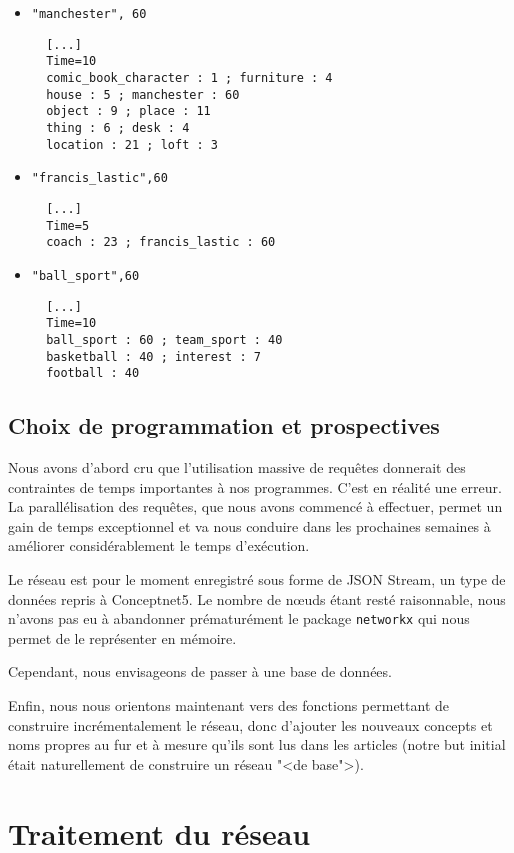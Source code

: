 \documentclass[a4paper,12pt]{article}
\newcommand{\pyt}[1]{\texttt{#1}}
\begin{document}
\begin{itemize}
 \item \verb|"manchester", 60|
 \begin{verbatim}
  [...]
  Time=10
  comic_book_character : 1 ; furniture : 4
  house : 5 ; manchester : 60
  object : 9 ; place : 11
  thing : 6 ; desk : 4
  location : 21 ; loft : 3
 \end{verbatim}
\item \verb|"francis_lastic",60|
\begin{verbatim}
  [...]
  Time=5
  coach : 23 ; francis_lastic : 60
\end{verbatim}
\item \verb|"ball_sport",60|
\begin{verbatim}
  [...]
  Time=10
  ball_sport : 60 ; team_sport : 40
  basketball : 40 ; interest : 7
  football : 40
\end{verbatim}
\end{itemize}

\subsection{Choix de programmation et prospectives}

Nous avons d'abord cru que l'utilisation massive de requ\^etes donnerait des contraintes de temps importantes \`a nos programmes. C'est en r\'ealit\'e une erreur. La parall\'elisation des requ\^etes, que nous avons commenc\'e \`a effectuer, permet un gain de temps exceptionnel et va nous conduire dans les prochaines semaines \`a am\'eliorer consid\'erablement le temps d'ex\'ecution.

Le r\'eseau est pour le moment enregistr\'e sous forme de JSON Stream, un type de donn\'ees repris \`a Conceptnet5. Le nombre de nœuds \'etant rest\'e raisonnable, nous n'avons pas eu \`a abandonner pr\'ematur\'ement le package \pyt{networkx} qui nous permet de le repr\'esenter en m\'emoire.

Cependant, nous envisageons de passer \`a une base de donn\'ees.

Enfin, nous nous orientons maintenant vers des fonctions permettant de construire incr\'ementalement le r\'eseau, donc d'ajouter les nouveaux concepts et noms propres au fur et \`a mesure qu'ils sont lus dans les articles (notre but initial \'etait naturellement de construire un r\'eseau "<de base">).

\section{Traitement du r\'eseau}
\end{document}
